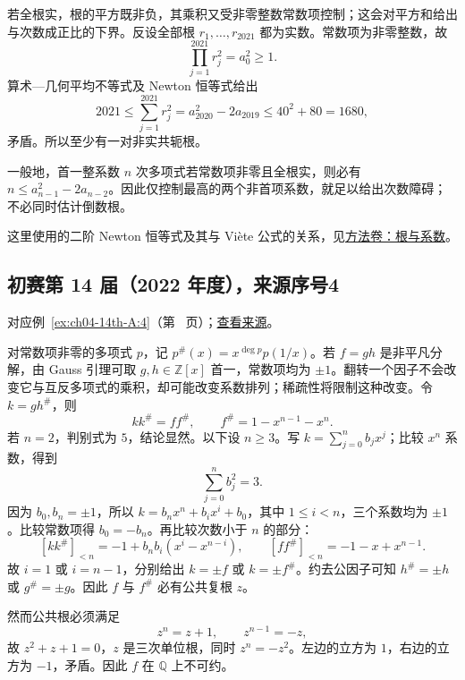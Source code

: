 \documentclass[12pt,fontset=fandol]{ctexart}
\begin{document}
\begin{solve}

若全根实，根的平方既非负，其乘积又受非零整数常数项控制；这会对平方和给出与次数成正比的下界。反设全部根 $r_1,\ldots,r_{2021}$ 都为实数。常数项为非零整数，故
\[
\prod_{j=1}^{2021}r_j^2=a_0^2\geq1.
\]
算术---几何平均不等式及 Newton 恒等式给出
\[
2021\leq\sum_{j=1}^{2021}r_j^2
=a_{2020}^2-2a_{2019}
\leq40^2+80=1680,
\]
矛盾。所以至少有一对非实共轭根。

\end{solve}

\begin{remark}[方法与条件]

一般地，首一整系数 $n$ 次多项式若常数项非零且全根实，则必有 $n\leq a_{n-1}^2-2a_{n-2}$。因此仅控制最高的两个非首项系数，就足以给出次数障碍；不必同时估计倒数根。

这里使用的二阶 Newton 恒等式及其与 Viète 公式的关系，见\hyperref[app:algebra-roots]{方法卷：根与系数}。

\end{remark}

\subsection{初赛第 14 届（2022 年度），来源序号4}\label{ans:ch04-14th-A:4}\label{pr:ch04-14th-A:4}

对应例~\ref{ex:ch04-14th-A:4}（第~\pageref{ex:ch04-14th-A:4} 页）；\href{https://github.com/lzxcr/cmc-mathematics/blob/64916fa1fdbc3e444a652eca204d5669058ee321/src/problems/preliminary/14/04.md}{查看来源}。

\begin{solve}

对常数项非零的多项式 $p$，记 $p^\#(x)=x^{\deg p}p(1/x)$。若 $f=gh$ 是非平凡分解，由 Gauss 引理可取 $g,h\in\mathbb Z[x]$ 首一，常数项均为 $\pm1$。翻转一个因子不会改变它与互反多项式的乘积，却可能改变系数排列；稀疏性将限制这种改变。令 $k=gh^\#$，则
\[
kk^\#=ff^\#,
\qquad
f^\#=1-x^{n-1}-x^n.
\]
若 $n=2$，判别式为 $5$，结论显然。以下设 $n\geq3$。写 $k=\sum_{j=0}^n b_jx^j$；比较 $x^n$ 系数，得到
\[
\sum_{j=0}^n b_j^2=3.
\]
因为 $b_0,b_n=\pm1$，所以 $k=b_nx^n+b_ix^i+b_0$，其中 $1\leq i<n$，三个系数均为 $\pm1$。比较常数项得 $b_0=-b_n$。再比较次数小于 $n$ 的部分：
\[
[kk^\#]_{<n}=-1+b_nb_i(x^i-x^{n-i}),
\qquad
[ff^\#]_{<n}=-1-x+x^{n-1}.
\]
故 $i=1$ 或 $i=n-1$，分别给出 $k=\pm f$ 或 $k=\pm f^\#$。约去公因子可知 $h^\#=\pm h$ 或 $g^\#=\pm g$。因此 $f$ 与 $f^\#$ 必有公共复根 $z$。

然而公共根必须满足
\[
z^n=z+1,\qquad z^{n-1}=-z,
\]
故 $z^2+z+1=0$，$z$ 是三次单位根，同时 $z^n=-z^2$。左边的立方为 $1$，右边的立方为 $-1$，矛盾。因此 $f$ 在 $\mathbb Q$ 上不可约。

\end{solve}
\end{document}
